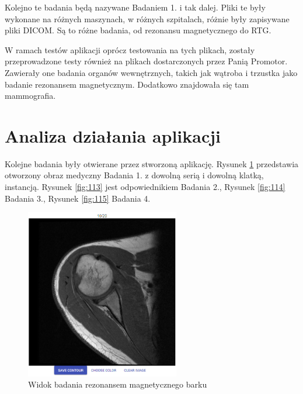 \documentclass[a4paper,11pt,twoside,openright]{report}
\theoremstyle{definition}
\begin{document}
Kolejno te badania będą nazywane Badaniem 1. i tak dalej. Pliki te były wykonane na różnych maszynach, w różnych szpitalach, różnie były zapisywane pliki DICOM. Są to różne badania, od rezonansu magnetycznego do RTG.

W ramach testów aplikacji oprócz testowania na tych plikach, zostały przeprowadzone testy również na plikach dostarczonych przez Panią Promotor. Zawierały one badania organów wewnętrznych, takich jak wątroba i trzustka jako badanie rezonansem magnetycznym. Dodatkowo znajdowała się tam mammografia.

\section {Analiza działania aplikacji}

Kolejne badania były otwierane przez stworzoną aplikację. Rysunek \ref{fig:112} przedstawia otworzony obraz medyczny Badania 1. z dowolną serią i dowolną klatką, instancją. Rysunek \ref{fig:113} jest odpowiednikiem Badania 2., Rysunek \ref{fig:114} Badania 3., Rysunek \ref{fig:115} Badania 4.

\begin{figure}[p]
	\center
	\includegraphics[width=0.6\textwidth]{112}
	\caption{Widok badania rezonansem magnetycznego barku}
    	\label{fig:112}
\end{figure}
\end{document}
